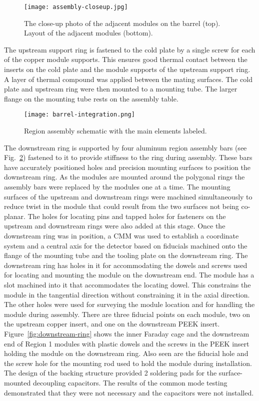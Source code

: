 \begin{figure}[h] 
\centering 
\texttt{[image: assembly-closeup.jpg]}
\caption{The close-up photo of the adjacent modules on the barrel (top). Layout of the adjacent modules (bottom).}
\label{fig:assembly-closeup}
\end{figure}

The upstream support ring is fastened to the cold plate by a single screw for each of the copper module supports. This ensures good thermal contact between the inserts on the cold plate and the module supports of the upstream support ring. A layer of thermal compound was applied between the mating surfaces. The cold plate and upstream ring were then mounted to a mounting tube. The larger flange on the mounting tube rests on the assembly table. 

\begin{figure}[h] 
\centering 
\texttt{[image: barrel-integration.png]}
\caption{Region assembly schematic with the main elements labeled.}
\label{fig:barrel-integration}
\end{figure}

The downstream ring is supported by four aluminum region assembly bars (see Fig.~\ref{fig:barrel-integration}) fastened to it to provide stiffness to the ring during assembly. These bars have accurately positioned holes and precision mounting surfaces to position the downstream ring. As the modules are mounted around the polygonal rings the assembly bars were replaced by the modules one at a time. The mounting surfaces of the upstream and downstream rings were machined simultaneously to reduce twist in the module that could result from the two surfaces not being co-planar. The holes for locating pins and tapped holes for fasteners on the upstream and downstream rings were also added at this stage. Once the downstream ring was in position, a CMM was used to establish a coordinate system and a central axis for the detector based on fiducials machined onto the flange of the mounting tube and the tooling plate on the downstream ring. The downstream ring has holes in it for accommodating the dowels and screws used for locating and mounting the module on the downstream end. The module has a slot machined into it that accommodates the locating dowel. This constrains the module in the tangential direction without constraining it in the axial direction. 
The other holes were used for surveying the module location and for handling the module during assembly. There are three fiducial points on each module, two on the upstream copper insert, and one on the downstream PEEK insert. Figure~\ref{fig:downstream-ring} shows the inner Faraday cage and the downstream end of Region 1 modules with plastic dowels and the screws in the PEEK insert holding the module on the downstream ring. Also seen are the fiducial hole and the screw hole for the mounting rod used to hold the module during installation. The design of the backing structure provided 2 soldering pads for the surface-mounted decoupling capacitors. The results of the common mode testing demonstrated that they were not necessary and the capacitors were not installed.


